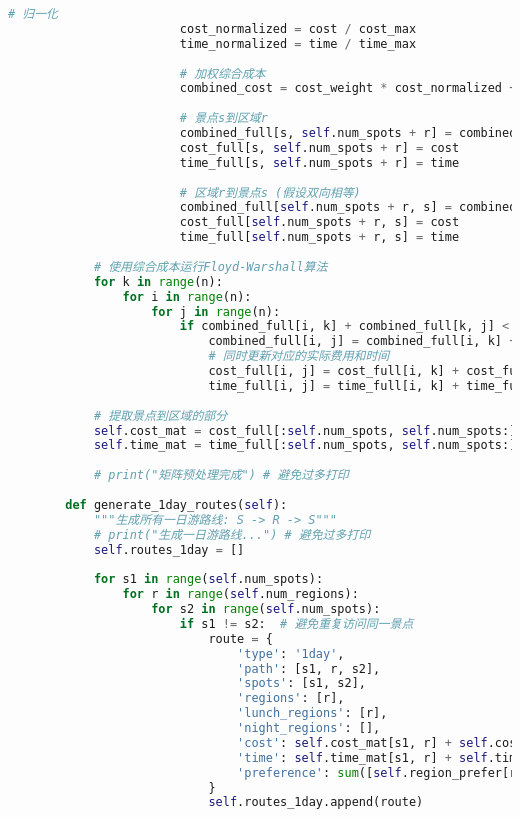 \begin{lstlisting}[language=Python]
                        # 归一化
                        cost_normalized = cost / cost_max
                        time_normalized = time / time_max
                        
                        # 加权综合成本
                        combined_cost = cost_weight * cost_normalized + time_weight * time_normalized
                        
                        # 景点s到区域r
                        combined_full[s, self.num_spots + r] = combined_cost
                        cost_full[s, self.num_spots + r] = cost
                        time_full[s, self.num_spots + r] = time
                        
                        # 区域r到景点s (假设双向相等)
                        combined_full[self.num_spots + r, s] = combined_cost
                        cost_full[self.num_spots + r, s] = cost
                        time_full[self.num_spots + r, s] = time
            
            # 使用综合成本运行Floyd-Warshall算法
            for k in range(n):
                for i in range(n):
                    for j in range(n):
                        if combined_full[i, k] + combined_full[k, j] < combined_full[i, j]:
                            combined_full[i, j] = combined_full[i, k] + combined_full[k, j]
                            # 同时更新对应的实际费用和时间
                            cost_full[i, j] = cost_full[i, k] + cost_full[k, j]
                            time_full[i, j] = time_full[i, k] + time_full[k, j]
            
            # 提取景点到区域的部分
            self.cost_mat = cost_full[:self.num_spots, self.num_spots:]
            self.time_mat = time_full[:self.num_spots, self.num_spots:]
            
            # print("矩阵预处理完成") # 避免过多打印
            
        def generate_1day_routes(self):
            """生成所有一日游路线: S -> R -> S"""
            # print("生成一日游路线...") # 避免过多打印
            self.routes_1day = []
            
            for s1 in range(self.num_spots):
                for r in range(self.num_regions):
                    for s2 in range(self.num_spots):
                        if s1 != s2:  # 避免重复访问同一景点
                            route = {
                                'type': '1day',
                                'path': [s1, r, s2],
                                'spots': [s1, s2],
                                'regions': [r],
                                'lunch_regions': [r],
                                'night_regions': [],
                                'cost': self.cost_mat[s1, r] + self.cost_mat[s2, r],
                                'time': self.time_mat[s1, r] + self.time_mat[s2, r],
                                'preference': sum([self.region_prefer[r]]) + 2  # 景点基础偏好
                            }
                            self.routes_1day.append(route)
            

\end{lstlisting}
